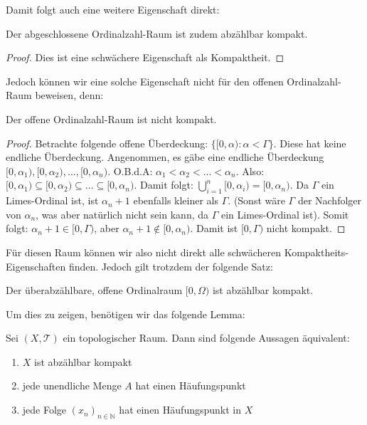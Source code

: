 \documentclass[11pt]{scrartcl}
\begin{document}
Damit folgt auch eine weitere Eigenschaft direkt:
\begin{corollary}
	Der abgeschlossene Ordinalzahl-Raum ist zudem abzählbar kompakt.
\end{corollary}
\begin{proof}
	Dies ist eine schwächere Eigenschaft als Kompaktheit.
\end{proof}
Jedoch können wir eine solche Eigenschaft nicht für den offenen Ordinalzahl-Raum beweisen, denn:
\begin{theorem}
	Der offene Ordinalzahl-Raum ist nicht kompakt.
\end{theorem}
\begin{proof}
	Betrachte folgende offene Überdeckung: $\{[0,\alpha): \alpha <\Gamma\}$. Diese hat keine endliche Überdeckung.
	Angenommen, es gäbe eine endliche Überdeckung $[0,\alpha_1),[0,\alpha_2),...,[0,\alpha_n)$. O.B.d.A: $\alpha_1 <\alpha_2 < ... < \alpha_n$. Also: $[0,\alpha_1)\subseteq [0,\alpha_2)\subseteq ... \subseteq [0,\alpha_n)$.
	Damit folgt: $\bigcup_{i=1}^n [0,\alpha_i)=[0,\alpha_n)$. Da $\Gamma$ ein Limes-Ordinal ist, 
	ist $\alpha_n+1$ ebenfalls kleiner als $\Gamma$. (Sonst wäre $\Gamma$ der Nachfolger von $\alpha_n$, was aber natürlich nicht sein kann, da $\Gamma$ ein Limes-Ordinal ist).
	Somit folgt: $\alpha_n+1 \in [0, \Gamma)$, aber $\alpha_n+1\notin [0,\alpha_n)$. Damit ist $[0,\Gamma)$ nicht kompakt.
\end{proof}
Für diesen Raum können wir also nicht direkt alle schwächeren Kompaktheits-Eigenschaften finden. Jedoch gilt trotzdem der folgende Satz:
\begin{theorem}
	Der überabzählbare, offene Ordinalraum $[0,\Omega)$ ist abzählbar kompakt.
\end{theorem}
Um dies zu zeigen, benötigen wir das folgende Lemma:
\begin{lemma}
	Sei $(X,\mathcal T)$ ein topologischer Raum. Dann sind folgende Aussagen äquivalent:\begin{enumerate}
		\item $X$ ist abzählbar kompakt
		\item jede unendliche Menge $A$ hat einen Häufungspunkt
		\item jede Folge $(x_n)_{n\in\mathbb N}$ hat einen Häufungspunkt in $X$
	\end{enumerate}
\end{lemma}
\end{document}
